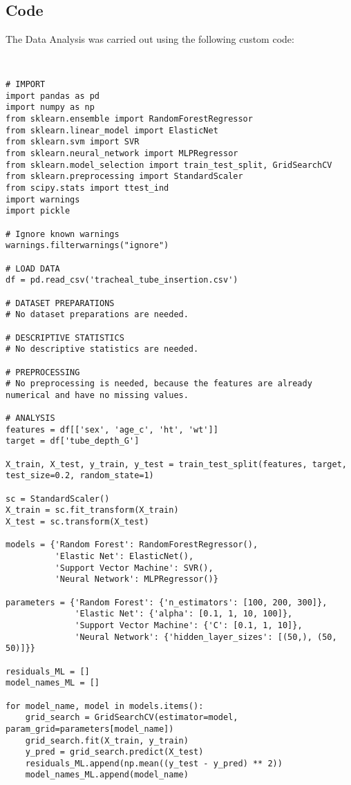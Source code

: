\documentclass[11pt]{article}
\begin{document}
\subsection{{Code}}
The Data Analysis was carried out using the following custom code:

\begin{verbatim}


# IMPORT
import pandas as pd
import numpy as np
from sklearn.ensemble import RandomForestRegressor
from sklearn.linear_model import ElasticNet
from sklearn.svm import SVR
from sklearn.neural_network import MLPRegressor
from sklearn.model_selection import train_test_split, GridSearchCV
from sklearn.preprocessing import StandardScaler
from scipy.stats import ttest_ind
import warnings
import pickle

# Ignore known warnings
warnings.filterwarnings("ignore")

# LOAD DATA
df = pd.read_csv('tracheal_tube_insertion.csv')

# DATASET PREPARATIONS
# No dataset preparations are needed.

# DESCRIPTIVE STATISTICS
# No descriptive statistics are needed.

# PREPROCESSING 
# No preprocessing is needed, because the features are already numerical and have no missing values.

# ANALYSIS
features = df[['sex', 'age_c', 'ht', 'wt']]
target = df['tube_depth_G']

X_train, X_test, y_train, y_test = train_test_split(features, target, test_size=0.2, random_state=1)

sc = StandardScaler()
X_train = sc.fit_transform(X_train)
X_test = sc.transform(X_test)

models = {'Random Forest': RandomForestRegressor(), 
          'Elastic Net': ElasticNet(), 
          'Support Vector Machine': SVR(),
          'Neural Network': MLPRegressor()}

parameters = {'Random Forest': {'n_estimators': [100, 200, 300]}, 
              'Elastic Net': {'alpha': [0.1, 1, 10, 100]}, 
              'Support Vector Machine': {'C': [0.1, 1, 10]},
              'Neural Network': {'hidden_layer_sizes': [(50,), (50, 50)]}}

residuals_ML = []
model_names_ML = []

for model_name, model in models.items():
    grid_search = GridSearchCV(estimator=model, param_grid=parameters[model_name])
    grid_search.fit(X_train, y_train)
    y_pred = grid_search.predict(X_test)
    residuals_ML.append(np.mean((y_test - y_pred) ** 2))
    model_names_ML.append(model_name)


\end{verbatim}
\end{document}
